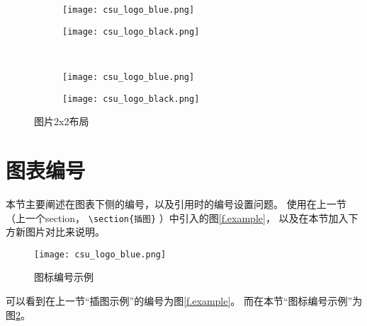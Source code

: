 \begin{figure}[!htb]
    \centering
    \begin{subfigure}[t]{0.3\linewidth}
        \captionsetup{justification=centering}
        \begin{minipage}[b]{1\linewidth}
            \centering
            \texttt{[image: csu\_logo\_blue.png]}
            \caption{}
        \end{minipage}
    \end{subfigure}
    \hspace{-5em}
    \begin{subfigure}[t]{0.3\linewidth}
        \captionsetup{justification=centering}
        \begin{minipage}[b]{1\linewidth}
            \centering
            \texttt{[image: csu\_logo\_black.png]}
            \caption{}
        \end{minipage}
    \end{subfigure}\\
    \begin{subfigure}[t]{0.3\linewidth}
        \captionsetup{justification=centering}
        \begin{minipage}[b]{1\linewidth}
            \centering
            \texttt{[image: csu\_logo\_blue.png]}
            \caption{}
        \end{minipage}
    \end{subfigure}
    \hspace{-5em}
    \begin{subfigure}[t]{0.3\linewidth}
        \captionsetup{justification=centering}
        \begin{minipage}[b]{1\linewidth}
            \centering
            \texttt{[image: csu\_logo\_black.png]}
            \caption{}
        \end{minipage}
    \end{subfigure}
    \caption{图片2x2布局}
    \label{f.csu_2x2}
\end{figure}

\newpage

\section{图表编号}

本节主要阐述在图表下侧的编号，以及引用时的编号设置问题。
使用在上一节（上一个section， \verb|\section{插图}| ）中引入的图\ref{f.example}，
以及在本节加入下方新图片对比来说明。

\begin{figure}[hbt]
    \centering
    \texttt{[image: csu\_logo\_blue.png]}
    \caption{图标编号示例}
    \label{f.example.2}
\end{figure}

可以看到在上一节“插图示例”的编号为图\ref{f.example}。
而在本节“图标编号示例”为图\ref{f.example.2}。
